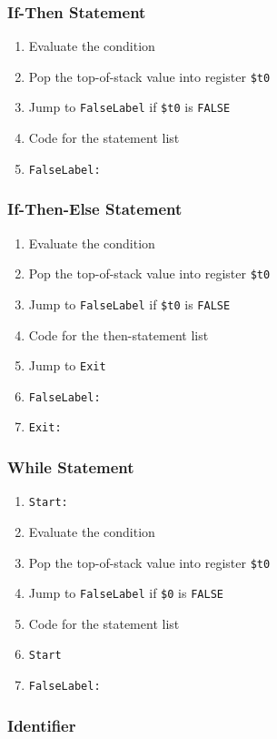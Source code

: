 \documentclass[11pt]{article}
\begin{document}
\subsubsection{If-Then Statement}
\label{sec:orgb411b1c}
\begin{enumerate}
\item Evaluate the condition
\item Pop the top-of-stack value into register \texttt{\$t0}
\item Jump to \texttt{FalseLabel} if \texttt{\$t0} is \texttt{FALSE}
\item Code for the statement list
\item \texttt{FalseLabel:}
\end{enumerate}
\subsubsection{If-Then-Else Statement}
\label{sec:org31f0dd5}
\begin{enumerate}
\item Evaluate the condition
\item Pop the top-of-stack value into register \texttt{\$t0}
\item Jump to \texttt{FalseLabel} if \texttt{\$t0} is \texttt{FALSE}
\item Code for the then-statement list
\item Jump to \texttt{Exit}
\item \texttt{FalseLabel:}
\item \texttt{Exit:}
\end{enumerate}
\subsubsection{While Statement}
\label{sec:orgefe0aff}
\begin{enumerate}
\item \texttt{Start:}
\item Evaluate the condition
\item Pop the top-of-stack value into register \texttt{\$t0}
\item Jump to \texttt{FalseLabel} if \texttt{\$0} is \texttt{FALSE}
\item Code for the statement list
\item \texttt{Start}
\item \texttt{FalseLabel:}
\end{enumerate}
\subsubsection{Identifier}
\label{sec:orgd02d271}
\end{document}
